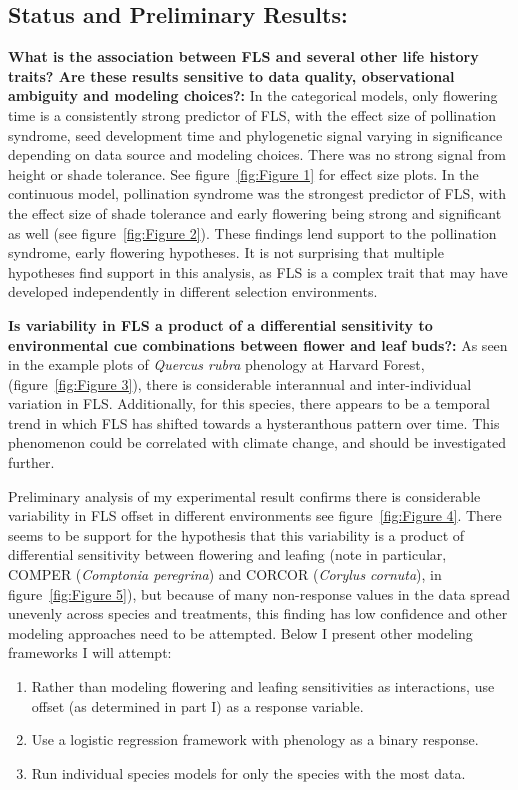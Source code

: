 \documentclass{article}\usepackage[]{graphicx}\usepackage[]{color}
\begin{document}
\subsection*{Status and Preliminary Results:}
\indent\indent\textbf{What is the association between FLS and several other life history traits?  Are these results sensitive to data quality, observational ambiguity and modeling choices?:} In the categorical models, only flowering time is a consistently strong predictor of FLS, with the effect size of pollination syndrome, seed development time and phylogenetic signal varying in significance depending on data source and modeling choices. There was no strong signal from height or shade tolerance. See figure~\ref{fig:Figure 1} for effect size plots.
In the continuous model, pollination syndrome was the strongest predictor of FLS, with the effect size of shade tolerance and early flowering being strong and significant as well (see figure~\ref{fig:Figure 2}). These findings lend support to the pollination syndrome, early flowering hypotheses. It is not surprising that multiple hypotheses find support in this analysis, as FLS is a complex trait that may have developed independently in different selection environments.
\par\textbf{Is variability in FLS a product of a differential sensitivity to environmental cue combinations between flower and leaf buds?:} As seen in the  example plots of \textit{Quercus rubra} phenology at Harvard Forest,(figure~\ref{fig:Figure 3}), there is considerable interannual and inter-individual variation in FLS. Additionally, for this species, there appears to be a temporal trend in which FLS has shifted towards a hysteranthous pattern over time. This phenomenon could be correlated with climate change, and should be investigated further.
\par Preliminary analysis of my experimental result confirms there is considerable variability in FLS offset in different environments see figure~\ref{fig:Figure 4}.  There seems to be support for the hypothesis that this variability is a product of differential sensitivity between flowering and leafing (note in particular, COMPER (\textit{Comptonia peregrina}) and CORCOR (\textit{Corylus cornuta}), in figure~\ref{fig:Figure 5}), but because of many non-response values in the data spread unevenly across species and treatments, this finding has low confidence and other modeling approaches need to be attempted. Below I present other modeling frameworks I will attempt:
\begin{enumerate}
\item Rather than modeling flowering and leafing sensitivities as interactions, use offset (as determined in part I) as a response variable.
\item Use a logistic regression framework with phenology as a binary response.
\item Run individual species models for only the species with the most data.
\end{enumerate}
\end{document}
